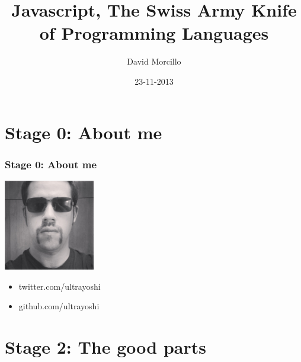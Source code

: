 \documentclass{beamer}
\begin{document}





\title{Javascript, The Swiss Army Knife of Programming Languages}
\author{David Morcillo}
\date{23-11-2013}

\begin{frame}
  \titlepage
\end{frame}

\section{Stage 0: About me}

\begin{frame}
  \frametitle{Stage 0: About me}
  \includegraphics[width=150px]{images/bastard_david.jpg}
  \begin{itemize}
    \item twitter.com/ultrayoshi
    \item github.com/ultrayoshi
  \end{itemize}
\end{frame}



\section{Stage 2: The good parts}
\end{document}
